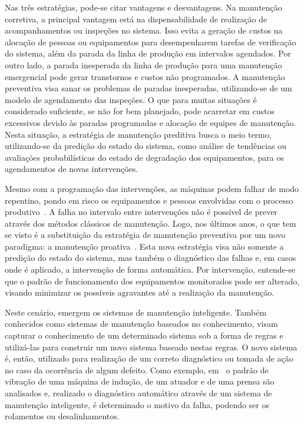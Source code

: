 Nas três estratégias, pode-se citar vantagens e desvantagens. Na manutenção corretiva, a principal
vantagem está na dispensabilidade de realização de acompanhamentos ou inspeções no sistema. Isso
evita a geração de custos na alocação de pessoas ou equipamentos para desempenharem tarefas de
verificação do sistema, além da parada da linha de produção em intervalos agendados. Por outro lado,
a parada inesperada da linha de produção para uma manutenção emergencial pode gerar transtornos e
custos não programados. A manutenção preventiva visa sanar os problemas de paradas inesperadas,
utilizando-se de um modelo de agendamento das inspeções. O que para muitas situações é considerado
suficiente, se não for bem planejado, pode acarretar em custos excessivos devido às paradas
programadas e alocação de equipes de manutenção. Nesta situação, a estratégia de manutenção
preditiva busca o meio termo, utilizando-se da predição do estado do sistema, como análise de
tendências ou avaliações probabilísticas do estado de degradação dos equipamentos, para os
agendamentos de novas intervenções.

Mesmo com a programação das intervenções, as máquinas podem falhar de modo repentino, pondo em risco
os equipamentos e pessoas envolvidas com o processo produtivo~\cite{goncalves2011desenvolvimento}. A
falha no intervalo entre intervenções não é possível de prever através dos métodos clássicos de
manutenção. Logo, nos últimos anos, o que tem se visto é a substituição da estratégia de manutenção
preventiva por um novo paradigma: a manutenção proativa~\cite{lee2009informatics}. Esta nova
estratégia visa não somente a predição do estado do sistema, mas também o diagnóstico das falhas e,
em casos onde é aplicado, a intervenção de forma automática. Por intervenção, entende-se que o
padrão de funcionamento dos equipamentos monitorados pode ser alterado, visando minimizar os
possíveis agravantes até a realização da manutenção.

Neste cenário, emergem os sistemas de manutenção inteligente. Também conhecidos como sistemas de
manutenção baseados no conhecimento, visam capturar o conhecimento de um determinado sistema sob a
forma de regras e utilizá-las para construir um novo sistema baseado nestas regras. O novo sistema
é, então, utilizado para realização de um correto diagnóstico ou tomada de ação no caso da
ocorrência de algum defeito. Como exemplo, em~\cite{shikari2004automation} o padrão de vibração de
uma máquina de indução, de um atuador e de uma prensa são analisados e, realizado o diagnóstico
automático através de um sistema de manutenção inteligente, é determinado o motivo da falha, podendo
ser os rolamentos ou desalinhamentos.

